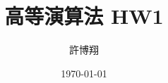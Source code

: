 \setlength{\parindent}{0pt}

\title{高等演算法 HW1}
\author{許博翔}
\date{\today}
\maketitle
\thispagestyle{empty}
\setcounter{page}{1}
\pagestyle{fancy}

\renewcommand{\sectionmark}[1]{\markright{#1}}
\renewcommand{\subsectionmark}[1]{}

\lhead{\thetitle}
\chead{}
\rhead{}
\cfoot{}
\rfoot{\thepage}
\renewcommand{\headrulewidth}{0.4pt}
\renewcommand{\footrulewidth}{0.4pt}








\newpage
